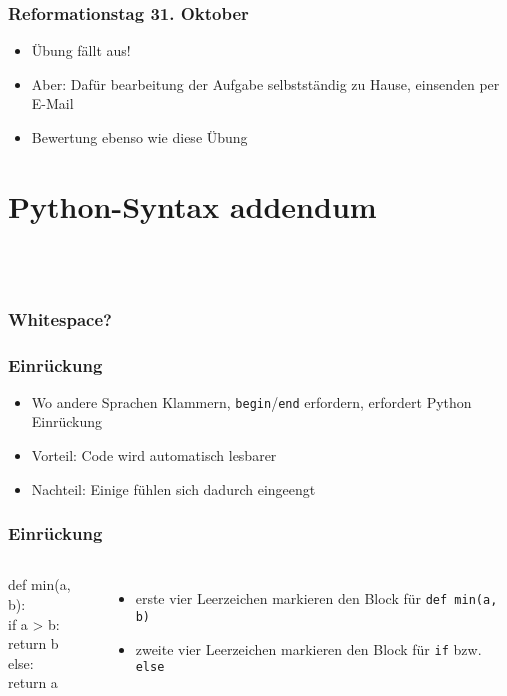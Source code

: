     \begin{frame}
        \frametitle{Reformationstag 31. Oktober}
        \begin{itemize}
        \item Übung fällt aus!
        \pause
        \item Aber: Dafür bearbeitung der Aufgabe selbstständig zu Hause,
            einsenden per E-Mail
        \item Bewertung ebenso wie diese Übung
        \end{itemize}
    \end{frame}

    \section{Python-Syntax addendum}
    \subsection{~}

    \begin{frame}
        \frametitle{Whitespace?}
    \end{frame}

    \begin{frame}
        \frametitle{Einrückung}
        \begin{itemize}
        \item Wo andere Sprachen Klammern, \texttt{begin}/\texttt{end}
            erfordern, erfordert Python Einrückung
        \pause
        \item Vorteil: Code wird automatisch lesbarer
        \item Nachteil: Einige fühlen sich dadurch eingeengt
        \end{itemize}
    \end{frame}

    \begin{frame}
        \frametitle{Einrückung}
        \begin{columns}%
            \small \ttfamily
            def min(a, b): \\
            \bs if a > b: \\
            \bs \bs return b \\
            \bs else: \\
            \bs \bs return a \\
            \begin{itemize}
            \item erste vier Leerzeichen markieren den Block für \texttt{def min(a, b)}
            \item zweite vier Leerzeichen markieren den Block für \texttt{if} bzw. \texttt{else}
            \end{itemize}
        \end{columns}
    \end{frame}

